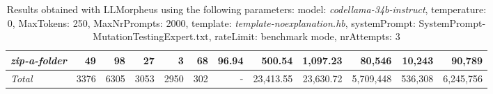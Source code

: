 \begin{table*}
{\begin{tabular}{l||r|r|r|r|r|r||r|r||r|r|r}
   \hline
   \textit{zip-a-folder} & 49 & 98 & 27 & 3 & 68 & 96.94 & 500.54 & 1,097.23 & 80,546 & 10,243 & 90,789 \\ 
   \hline
   \textit{Total} & 3376 & 6305 & 3053 & 2950 & 302 & - & 23,413.55  & 23,630.72 & 5,709,448 & 536,308 & 6,245,756 \\ 
 \end{tabular}
 }
 \caption{Results obtained with LLMorpheus using the following parameters: 
   model: \textit{codellama-34b-instruct}, 
   temperature: 0, 
   MaxTokens: 250, 
   MaxNrPrompts: 2000, 
   template: \textit{template-noexplanation.hb}, 
   systemPrompt: SystemPrompt-MutationTestingExpert.txt, 
   rateLimit: benchmark mode, 
   nrAttempts: 3  
 }
\end{table*}

